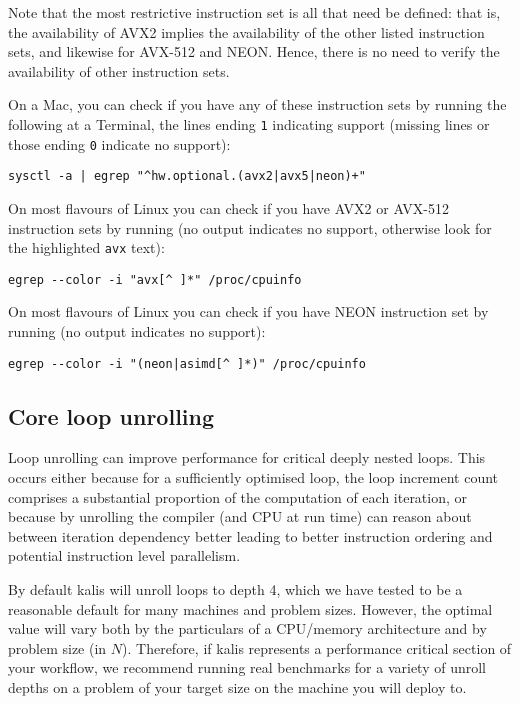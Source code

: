 \documentclass[a4paper]{article}
\newcommand{\pkg}[1]{{\fontseries{m}\fontseries{b}\selectfont #1}}
\begin{document}
Note that the most restrictive instruction set is all that need be defined: that is, the availability of AVX2 implies the availability of the other listed instruction sets, and likewise for AVX-512 and NEON.
Hence, there is no need to verify the availability of other instruction sets.

On a Mac, you can check if you have any of these instruction sets by running the following at a Terminal, the lines ending \texttt{1} indicating support (missing lines or those ending \texttt{0} indicate no support):

\begin{verbatim}
sysctl -a | egrep "^hw.optional.(avx2|avx5|neon)+"
\end{verbatim}

On most flavours of Linux you can check if you have AVX2 or AVX-512 instruction sets by running (no output indicates no support, otherwise look for the highlighted \texttt{avx} text):

\begin{verbatim}
egrep --color -i "avx[^ ]*" /proc/cpuinfo
\end{verbatim}

On most flavours of Linux you can check if you have NEON instruction set by running (no output indicates no support):

\begin{verbatim}
egrep --color -i "(neon|asimd[^ ]*)" /proc/cpuinfo
\end{verbatim}



\subsection{Core loop unrolling}
\label{apx:unroll}

Loop unrolling can improve performance for critical deeply nested loops.
This occurs either because for a sufficiently optimised loop, the loop increment count comprises a substantial proportion of the computation of each iteration, or because by unrolling the compiler (and CPU at run time) can reason about between iteration dependency better leading to better instruction ordering and potential instruction level parallelism.

By default \pkg{kalis} will unroll loops to depth 4, which we have tested to be a reasonable default for many machines and problem sizes.
However, the optimal value will vary both by the particulars of a CPU/memory architecture and by problem size (in \(N\)).
Therefore, if \pkg{kalis} represents a performance critical section of your workflow, we recommend running real benchmarks for a variety of unroll depths on a problem of your target size on the machine you will deploy to.
\end{document}
